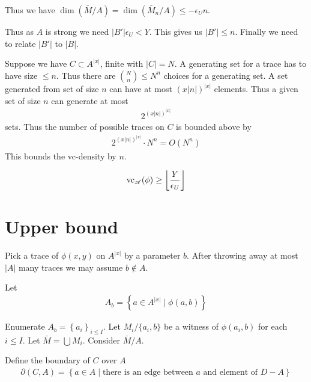 \documentclass{amsart}
\renewcommand{\AA}{\mathscr A}
\newcommand{\curly}[1]{\left\{#1\right\}}
\providecommand{\floor}[1]{\left \lfloor #1 \right \rfloor }
\begin{document}
Thus we have $\dim(\bar M / A) = \dim(\bar M_n / A) \leq -\epsilon_U n$.

Thus as $A$ is strong we need $|B'| \epsilon_U < Y$.
This gives us $|B'| \leq n$.
Finally we need to relate $|B'|$ to $|B|$.

Suppose we have $C \subset A^{|x|}$, finite with $|C| = N$.
A generating set for a trace has to have size $\leq n$.
Thus there are ${N \choose n} \leq N^n$ choices for a generating set.
A set generated from set of size $n$ can have at most $(x|n|)^{|x|}$ elements.
Thus a given set of size $n$ can generate at most
\begin{align*}
	2^{(x|n|)^{|x|}}
\end{align*}
sets.
Thus the number of possible traces on $C$ is bounded above by
\begin{align*}
  2^{(x|n|)^{|x|}} \cdot N^n = O(N^n)
\end{align*}
This bounds the vc-density by $n$.

\begin{align*}
	\vc_\AA(\phi) \geq \floor{\frac{Y}{\epsilon_U}}
\end{align*}

\section{Upper bound}


Pick a trace of $\phi(x,y)$ on $A^{|x|}$ by a parameter $b$.
After throwing away at most $|A|$ many traces we may assume $b \notin A$.

Let
\begin{align*}
	A_b = \curly{a \in A^{|x|} \mid \phi(a, b)}
\end{align*}

Enumerate $A_b = \curly{a_i}_{i \leq I}$.
Let $M_i / \{a_i, b\}$ be a witness of $\phi(a_i, b)$ for each $i \leq I$.
Let $\bar M = \bigcup M_i$.
Consider $\bar M / A$.

\begin{Definition}
	Define the boundary of $C$ over $A$
	\begin{align*}
		\partial(C, A) = \curly{a \in A \mid \text{there is an edge between $a$ and element of $D - A$}}
	\end{align*}
\end{Definition}
\end{document}
